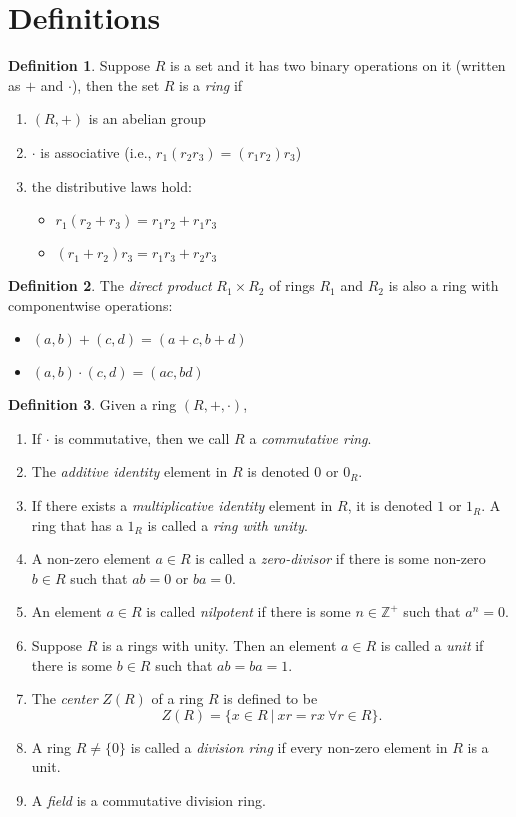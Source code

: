 \documentclass[12pt]{article}
\newcommand{\enumarabic}[1]{
	\begin{enumerate}[label=\textbf{\arabic*.}]
		#1
	\end{enumerate}
}
\theoremstyle{definition}
\newtheorem*{defn}{Definition}
\newcommand{\Z}{\mathbb{Z}}
\newcommand{\bulletize}[1]{%
	\begin{itemize}
		#1
	\end{itemize}
}
\begin{document}
\section*{Definitions}

\begin{defn}
	Suppose $R$ is a set and it has two binary operations on it (written as $+$ and $\cdot$), then the set $R$ is a \emph{ring} if 
	\enumarabic{
		\item $(R,+)$ is an abelian group
		\item $\cdot$ is associative (i.e., $r_1(r_2r_3)=(r_1r_2)r_3$)
		\item the distributive laws hold:
		\bulletize{\item $r_1(r_2+r_3)=r_1r_2+r_1r_3$\item $(r_1+r_2)r_3=r_1r_3+r_2r_3$}
	}
\end{defn}
\begin{defn}
	The \emph{direct product} $R_1\times R_2$ of rings $R_1$ and $R_2$ is also a ring with componentwise operations:
	\bulletize{\item $(a,b)+(c,d)=(a+c,b+d)$\item $(a,b)\cdot(c,d)=(ac,bd)$} 
\end{defn}
\begin{defn}
	Given a ring $(R,+,\cdot)$,
	\enumarabic{
		\item If $\cdot$ is commutative, then we call $R$ a \emph{commutative ring}.
		\item The \emph{additive identity} element in $R$ is denoted $0$ or $0_R$.
		\item If there exists a \emph{multiplicative identity} element in $R$, it is denoted $1$ or $1_R$.  A ring that has a $1_R$ is called a \emph{ring with unity}.
		\item A non-zero element $a\in R$ is called a \emph{zero-divisor} if there is some non-zero $b\in R$ such that $ab=0$ or $ba=0$.
		\item An element $a\in R$ is called \emph{nilpotent} if there is some $n\in \Z^+$ such that $a^n=0$.
		\item Suppose $R$ is a rings with unity.  Then an element $a\in R$ is called a \emph{unit} if there is some $b\in R$ such that $ab=ba=1$.
		\item The \emph{center} $Z(R)$ of a ring $R$ is defined to be 
		\[Z(R)=\{x\in R\ |\ xr=rx\ \forall r\in R\}.\]
		\item A ring $R\neq\{0\}$ is called a \emph{division ring} if every non-zero element in $R$ is a unit.
		\item A \emph{field} is a commutative division ring.
	}
\end{defn}
\end{document}
